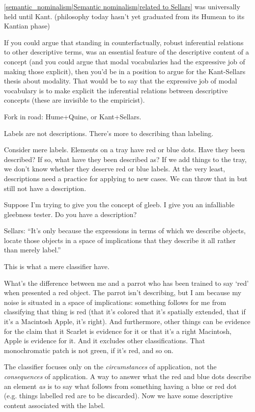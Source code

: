 \ref{semantic_nominalism|Semantic nominalism|related to Sellars} was universally held until Kant. (philosophy today hasn't yet graduated from its Humean to its Kantian phase)

If you could argue that standing in counterfactually, robust inferential relations to other descriptive terms, was an essential feature of the descriptive content of a concept (and you could argue that modal vocabularies had the expressive job of making those explicit), then you'd be in a position to argue for the Kant-Sellars thesis about modality. That would be to say that the expressive job of modal vocabulary is to make explicit the inferential relations between descriptive concepts (these are invisible to the empiricist).

Fork in road: Hume+Quine, or Kant+Sellars.

Labels are not descriptions. There's more to describing than labeling.

Consider mere labels. Elements on a tray have red or blue dots. Have they been described? If so, what have they been described as? If we add things to the tray, we don't know whether they deserve red or blue labels. At the very least, descriptions need a practice for applying to new cases. We can throw that in but still not have a description.

Suppose I'm trying to give you the concept of gleeb. I give you an infalliable gleebness tester. Do you have a description?

Sellars: ``It's only because the expressions in terms of which we describe objects, locate those objects in a space of implications that they describe it all rather than merely label.''

This is what a mere classifier have.

What's the difference between me and a parrot who has been trained to say `red' when presented a red object. The parrot isn't describing, but I am because my noise is situated in a space of implications: something follows for me from classifying that thing is red (that it's colored that it's spatially extended, that if it's a Macintosh Apple, it's right). And furthermore, other things can be evidence for the claim that it Scarlet is evidence for it or that it's a right Macintosh, Apple is evidence for it. And it excludes other classifications. That monochromatic patch is not green, if it's red, and so on.

The classifier focuses only on the \emph{circumstances} of application, not the \emph{consequences} of application. A way to answer what the red and blue dots describe an element \emph{as} is to say what follows from something having a blue or red dot (e.g. things labelled red are to be discarded). Now we have some descriptive content associated with the label.

